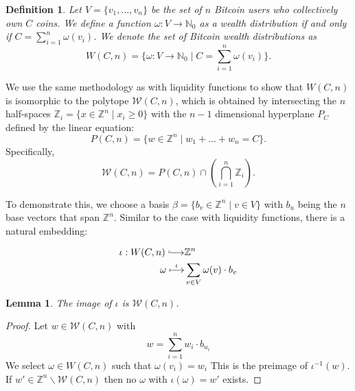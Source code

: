 \documentclass[10pt,twocolumn]{article}
\newtheorem{definition}{Definition}[section]
\newtheorem{lemma}[theorem]{Lemma}
\newcommand{\longhookrightarrow}{\lhook\joinrel\longrightarrow}
\begin{document}
\begin{definition}
Let \( V = \{v_1, \dots, v_n\} \) be the set of \( n \) Bitcoin users who collectively own \( C \) coins. We define a function \( \omega: V \longrightarrow \mathbb{N}_0 \) as a wealth distribution if and only if \( C = \sum_{i=1}^n \omega(v_i) \). We denote the set of Bitcoin wealth distributions as
$$
W(C,n) = \{\omega: V \longrightarrow \mathbb{N}_0 \mid C = \sum_{i=1}^n \omega(v_i)\}.
$$
\end{definition}

We use the same methodology as with liquidity functions to show that \( W(C,n) \) is isomorphic to the polytope \( \mathcal{W}(C,n) \), which is obtained by intersecting the \( n \) half-spaces \( \mathbb{Z}_i = \{x \in \mathbb{Z}^n \mid x_i \geq 0\} \) with the \( n-1 \) dimensional hyperplane \( P_C \) defined by the linear equation:
$$
P(C,n) = \{w \in \mathbb{Z}^n \mid w_1 + \dots + w_n = C\}.
$$
Specifically,
$$
\mathcal{W}(C,n) = P(C,n) \cap \left( \bigcap_{i=1}^n \mathbb{Z}_i \right).
$$

To demonstrate this, we choose a basis \( \beta = \{b_{v} \in \mathbb{Z}^{n} \mid v \in V\} \) with \( b_{u} \) being the \( n \) base vectors that span \( \mathbb{Z}^{n} \). Similar to the case with liquidity functions, there is a natural embedding:

\begin{equation*}
  \begin{split}
\iota: W(C,n) \longhookrightarrow & \mathbb{Z}^{n} \\
\omega\stackrel{\iota}{\longmapsto} & \sum_{v\in V}\omega(v)\cdot b_{v}
\end{split}
\end{equation*}

\begin{lemma}
  The image of $\iota$ is $\mathcal{W}(C,n)$.
\end{lemma}
\begin{proof}
  Let $w\in \mathcal{W}(C,n)$ with
  $$w = \sum_{i=1}^nw_i\cdot b_{u_i}$$
  We select $\omega\in W(C,n)$ such that $\omega(v_i)=w_i$
  This is the preimage of $\iota^{-1}(w)$.
  If $w'\in \mathbb{Z}^n\backslash\mathcal{W}(C,n)$ then no $\omega$ with $\iota(\omega)=w'$ exists.
\end{proof}

\end{document}
